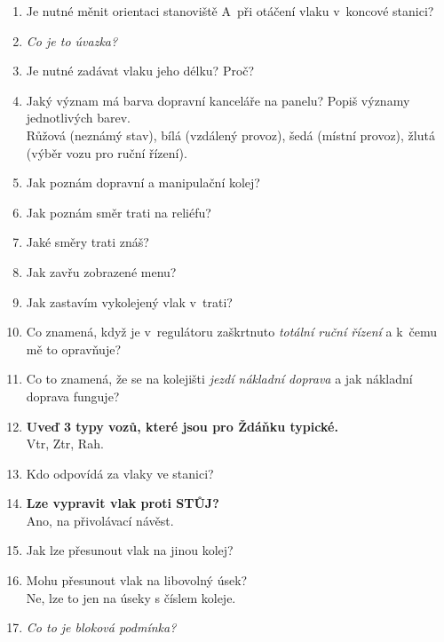 \documentclass[12pt,a4paper]{article}
\begin{document}
\begin{enumerate}[leftmargin=*]
\item Je nutné měnit orientaci stanoviště A~při otáčení vlaku v~koncové
stanici?

\item \textit{Co je to úvazka?}

\item Je nutné zadávat vlaku jeho délku? Proč?

\item Jaký význam má barva dopravní kanceláře na panelu? Popiš významy
jednotlivých barev.
\\Růžová (neznámý stav), bílá (vzdálený provoz), šedá (místní provoz), žlutá (výběr vozu pro ruční řízení).

\item Jak poznám dopravní a manipulační kolej?

\item Jak poznám směr trati na reliéfu?

\item Jaké směry trati znáš?

\item Jak zavřu zobrazené menu?

\item Jak zastavím vykolejený vlak v~trati?

\item Co znamená, když je v~regulátoru zaškrtnuto \textit{totální ruční řízení}
a k~čemu mě to opravňuje?

\item Co to znamená, že se na kolejišti \textit{jezdí nákladní doprava} a jak
nákladní doprava funguje?

\item \textbf{Uveď 3 typy vozů, které jsou pro Ždáňku typické.}
\\Vtr, Ztr, Rah.

\item Kdo odpovídá za vlaky ve stanici?

\item \textbf{Lze vypravit vlak proti STŮJ?}
\\Ano, na přivolávací návěst.

\item Jak lze přesunout vlak na jinou kolej?

\item Mohu přesunout vlak na libovolný úsek?
\\Ne, lze to jen na úseky s číslem koleje.

\item \textit{Co to je bloková podmínka?}


\end{enumerate}
\end{document}
